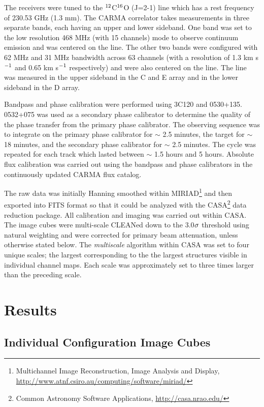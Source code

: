 \documentclass[manuscript]{aastex}
\begin{document}
The receivers were tuned to the $\rm{{}^{12}}$C$\rm{{}^{16}}$O (J=2-1) line which has a rest frequency of 230.53 GHz (1.3 mm). The CARMA correlator takes measurements in three separate bands, each having an upper and lower sideband. One band was set to the low resolution 468 MHz   (with 15 channels) mode to observe continuum emission and was centered on the line. The other two bands were configured with 62 MHz and 31 MHz bandwidth across 63 channels (with a resolution of 1.3 km s$\rm{{}^{-1}}$ and 0.65 km s$\rm{{}^{-1}}$ respectively) and were also centered on the line. The line was measured in the upper sideband in the C and E array and in the lower sideband in the D array.

Bandpass and phase calibration were performed using 3C120 and 0530+135. 0532+075 was used as a secondary phase calibrator to determine the quality of the phase transfer from the primary phase calibrator. The observing sequence was to integrate on the primary phase calibrator for $\sim$ 2.5 minutes, the target for $\sim$ 18 minutes, and the secondary phase calibrator for $\sim$ 2.5 minutes. The cycle was repeated for each track which lasted between $\sim$ 1.5 hours and 5 hours. Absolute flux calibration was carried out using the bandpass and phase calibrators in the continuously updated CARMA flux catalog.

The raw data was initially Hanning smoothed within MIRIAD\footnote{Multichannel Image Reconstruction, Image Analysis and Display, \url{http://www.atnf.csiro.au/computing/software/miriad/}} and then exported into FITS format so that it could be analyzed with the CASA\footnote{Common Astronomy Software Applications, \url{http://casa.nrao.edu/}} data reduction package. All calibration and imaging was carried out within CASA. The image cubes  were multi-scale  CLEANed down to the 3.0$\rm{\sigma}$ threshold using natural weighting and were corrected for primary beam attenuation, unless otherwise stated below. The \textit{multiscale} algorithm \citep{rich08} within CASA was set to four unique scales; the largest corresponding to the the largest structures visible in individual channel maps. Each scale was approximately set to three times larger than the preceding scale. 
\section{Results} 

\subsection{Individual Configuration Image Cubes} \label{results1} %
\end{document}
